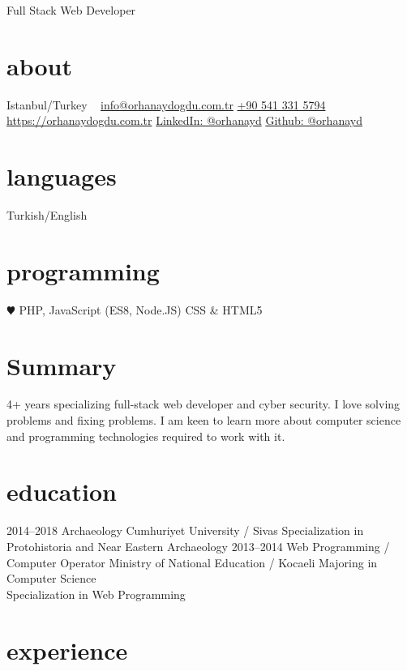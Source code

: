 \documentclass[]{friggeri-cv}
\begin{document}
       {Full Stack Web Developer}


\begin{aside}
  \section{about}
    Istanbul/Turkey
    ~
    \href{mailto:info@orhanaydogdu.com.tr}{info@orhanaydogdu.com.tr}
    \href{tel:+90 541 331 5794}{+90 541 331 5794}
    \href{https://orhanaydogdu.com.tr?lang=en}{https://orhanaydogdu.com.tr}
    \href{https://www.linkedin.com/in/orhanayd/}{LinkedIn: @orhanayd}
    \href{https://github.com/orhanayd/}{Github: @orhanayd}
  \section{languages}
    Turkish/English
  \section{programming}
    {\color{red} $\varheartsuit$} PHP, JavaScript
    (ES8, Node.JS)
    CSS \& HTML5
\end{aside}

\section{Summary}

4+ years specializing full-stack web developer and cyber security. I love solving problems and fixing problems. I am keen to learn more about computer science and programming technologies required to work with it.

\section{education}

\begin{entrylist}
  \entry
    {2014–2018}
    {Archaeology}
    {Cumhuriyet University / Sivas}
    {Specialization in Protohistoria and Near Eastern Archaeology}
  \entry
    {2013–2014}
    {Web Programming / Computer Operator}
    {Ministry of National Education / Kocaeli}
    {Majoring in Computer Science\\
    Specialization in Web Programming}
\end{entrylist}

\section{experience}
\end{document}
